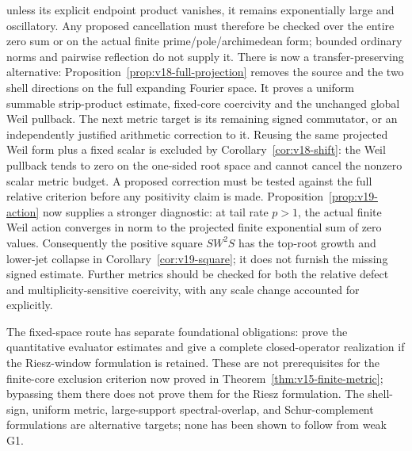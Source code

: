 \documentclass[11pt]{article}
\theoremstyle{remark}
\begin{document}
unless its explicit endpoint product vanishes, it remains exponentially
large and oscillatory. Any proposed cancellation must therefore be checked
over the entire zero sum or on the actual finite prime/pole/archimedean
form; bounded ordinary norms and pairwise reflection do not supply it.
There is now a transfer-preserving alternative:
Proposition~\ref{prop:v18-full-projection} removes the source and the
two shell directions on the full expanding Fourier space. It proves a
uniform summable strip-product estimate, fixed-core coercivity and the
unchanged global Weil pullback. The next metric target is its remaining
signed commutator, or an independently justified arithmetic correction
to it. Reusing the same projected Weil form plus a fixed scalar is
excluded by Corollary~\ref{cor:v18-shift}: the Weil pullback tends to
zero on the one-sided root space and cannot cancel the nonzero scalar
metric budget. A proposed correction must be tested against the full
relative criterion before any positivity claim is made.
Proposition~\ref{prop:v19-action} now supplies a stronger diagnostic:
at tail rate $p>1$, the actual finite Weil action converges in norm to
the projected finite exponential sum of zero values. Consequently
the positive square $SW^2S$ has the top-root growth and lower-jet
collapse in Corollary~\ref{cor:v19-square}; it does not furnish the
missing signed estimate. Further metrics should be checked for both
the relative defect and multiplicity-sensitive coercivity, with any
scale change accounted for explicitly.

The fixed-space route has separate foundational obligations: prove the
quantitative evaluator estimates and give a complete closed-operator
realization if the Riesz-window formulation is retained. These are not
prerequisites for the finite-core exclusion criterion now proved in
Theorem~\ref{thm:v15-finite-metric}; bypassing them there does not prove
them for the Riesz formulation. The shell-sign, uniform metric,
large-support spectral-overlap, and Schur-complement formulations are
alternative targets; none has been shown to follow from weak G1.
\end{document}
